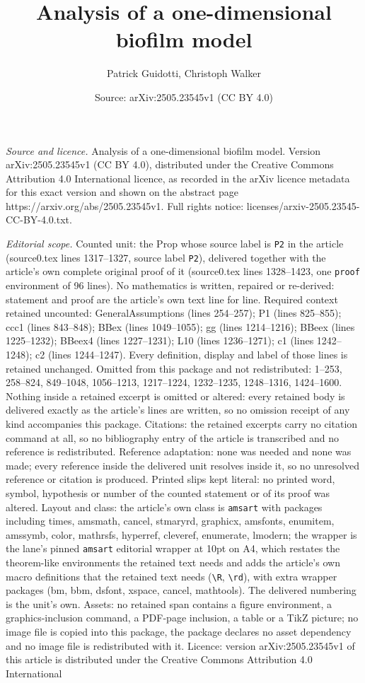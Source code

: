 \documentclass[10pt,a4paper]{amsart}
\title[Analysis of a one-dimensional biofilm model]{Analysis of a one-dimensional biofilm model}
\author{Patrick Guidotti, Christoph Walker}
\date{Source: arXiv:2505.23545v1 (CC BY 4.0)}
\begin{document}
\maketitle

\noindent\emph{Source and licence.} Analysis of a one-dimensional biofilm model. Version arXiv:2505.23545v1 (CC BY 4.0), distributed under the Creative Commons Attribution 4.0 International licence, as recorded in the arXiv licence metadata for this exact version and shown on the abstract page https://arxiv.org/abs/2505.23545v1. Full rights notice: licenses/arxiv-2505.23545-CC-BY-4.0.txt.\par\smallskip

\noindent\textit{Editorial scope.} Counted unit: the Prop whose source label is \texttt{P2} in the article (source0.tex lines 1317--1327, source label \texttt{P2}), delivered together with the article's own complete original proof of it (source0.tex lines 1328--1423, one \texttt{proof} environment of 96 lines). No mathematics is written, repaired or re-derived: statement and proof are the article's own text line for line. Required context retained uncounted: GeneralAssumptions (lines 254--257); P1 (lines 825--855); ccc1 (lines 843--848); BBex (lines 1049--1055); gg (lines 1214--1216); BBeex (lines 1225--1232); BBeex4 (lines 1227--1231); L10 (lines 1236--1271); c1 (lines 1242--1248); c2 (lines 1244--1247). Every definition, display and label of those lines is retained unchanged. Omitted from this package and not redistributed: 1--253, 258--824, 849--1048, 1056--1213, 1217--1224, 1232--1235, 1248--1316, 1424--1600. Nothing inside a retained excerpt is omitted or altered: every retained body is delivered exactly as the article's lines are written, so no omission receipt of any kind accompanies this package. Citations: the retained excerpts carry no citation command at all, so no bibliography entry of the article is transcribed and no reference is redistributed. Reference adaptation: none was needed and none was made; every reference inside the delivered unit resolves inside it, so no unresolved reference or citation is produced. Printed slips kept literal: no printed word, symbol, hypothesis or number of the counted statement or of its proof was altered. Layout and class: the article's own class is \texttt{amsart} with packages including times, amsmath, cancel, stmaryrd, graphicx, amsfonts, enumitem, amssymb, color, mathrsfs, hyperref, cleveref, enumerate, lmodern; the wrapper is the lane's pinned \texttt{amsart} editorial wrapper at 10pt on A4, which restates the theorem-like environments the retained text needs and adds the article's own macro definitions that the retained text needs (\texttt{\textbackslash R}, \texttt{\textbackslash rd}), with extra wrapper packages (bm, bbm, dsfont, xspace, cancel, mathtools). The delivered numbering is the unit's own. Assets: no retained span contains a figure environment, a graphics-inclusion command, a PDF-page inclusion, a table or a TikZ picture; no image file is copied into this package, the package declares no asset dependency and no image file is redistributed with it. Licence: version arXiv:2505.23545v1 of this article is distributed under the Creative Commons Attribution 4.0 International 
\end{document}
